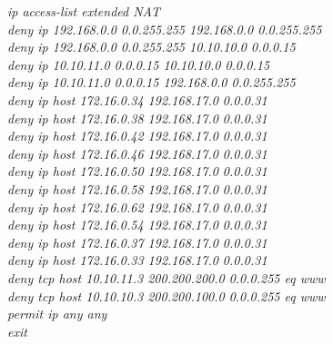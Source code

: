 \documentclass[a4paper, 12pt]{article}
\begin{document}
\hspace*{2cm}\textit{ip access-list extended NAT\\
\hspace*{2cm}deny ip 192.168.0.0 0.0.255.255 192.168.0.0 0.0.255.255\\
\hspace*{2cm}deny ip 192.168.0.0 0.0.255.255 10.10.10.0 0.0.0.15\\
\hspace*{2cm}deny ip 10.10.11.0 0.0.0.15 10.10.10.0 0.0.0.15\\
\hspace*{2cm}deny ip 10.10.11.0 0.0.0.15 192.168.0.0 0.0.255.255\\
\hspace*{2cm}deny ip host 172.16.0.34 192.168.17.0 0.0.0.31\\
\hspace*{2cm}deny ip host 172.16.0.38 192.168.17.0 0.0.0.31\\
\hspace*{2cm}deny ip host 172.16.0.42 192.168.17.0 0.0.0.31\\
\hspace*{2cm}deny ip host 172.16.0.46 192.168.17.0 0.0.0.31\\
\hspace*{2cm}deny ip host 172.16.0.50 192.168.17.0 0.0.0.31\\
\hspace*{2cm}deny ip host 172.16.0.58 192.168.17.0 0.0.0.31\\
\hspace*{2cm}deny ip host 172.16.0.62 192.168.17.0 0.0.0.31\\
\hspace*{2cm}deny ip host 172.16.0.54 192.168.17.0 0.0.0.31\\
\hspace*{2cm}deny ip host 172.16.0.37 192.168.17.0 0.0.0.31\\
\hspace*{2cm}deny ip host 172.16.0.33 192.168.17.0 0.0.0.31\\
\hspace*{2cm}deny tcp host 10.10.11.3 200.200.200.0 0.0.0.255 eq www\\
\hspace*{2cm}deny tcp host 10.10.10.3 200.200.100.0 0.0.0.255 eq www\\
\hspace*{2cm}permit ip any any\\
\hspace*{2cm}exit\\
}
\end{document}
